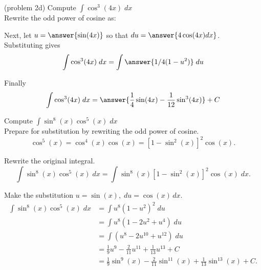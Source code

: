 \documentclass[handout]{ximera}
\begin{document}
\begin{problem}(problem 2d)
Compute $\displaystyle{\int \cos^3(4x) \; dx}$\\

Rewrite the odd power of cosine as:

\begin{multipleChoice}
\end{multipleChoice}

Next, let $u = \answer{\sin(4x)}$ so that $du = \answer{4\cos(4x) dx}$.\\

Substituting gives
\[
\int \cos^3(4x) \; dx= \int \answer{1/4 (1-u^2)} \; du
\]

Finally
\[
\int \cos^3(4x) \; dx= \answer{\frac14 \sin(4x) - \frac{1}{12} \sin^3(4x) } + C
\]

\end{problem}





\begin{example}[example 3]
Compute $\displaystyle{\int \sin^8(x)\cos^5(x) \; dx}$\\

Prepare for substitution by rewriting the odd power of cosine.
\[
\cos^5(x) = \cos^4(x) \cos(x) = \left[1 - \sin^2(x)\right]^2 \cos(x).
\]

Rewrite the original integral.
\[
\int \sin^8(x)\cos^5(x) \; dx = \int \sin^8(x)\left[1 - \sin^2(x)\right]^2 \cos(x) \; dx.
\]

Make the substitution $u = \sin(x), \; du = \cos(x) \, dx$.
\begin{align*}
\int \sin^8(x)\cos^5(x) \; dx &= \int u^8 (1-u^2)^2 \; du\\
   &= \int u^8 (1-2u^2 + u^4) \; du\\
   &= \int (u^8 -2u^{10} + u^{12}) \; du\\
  &= \tfrac19 u^9 - \tfrac{2}{11}u^{11} + \tfrac{1}{13} u^{13} + C \\
  &= \tfrac19 \sin^9(x) - \tfrac{2}{11} \sin^{11}(x)  + \tfrac{1}{13} \sin^{13}(x) + C.
\end{align*}
  
\end{example}
\end{document}
